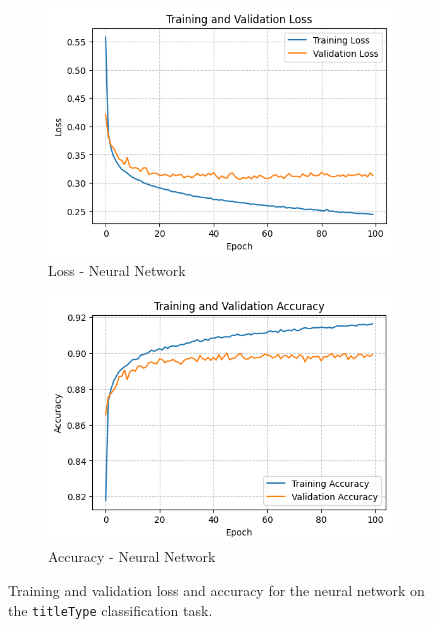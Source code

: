 
\begin{figure}
    \centering
    \begin{subfigure}[b]{0.48\textwidth}
        \centering
        \includegraphics[width=\textwidth]{plotsss/loss_titletype.png}
        \caption{Loss - Neural Network}
        \label{fig:loss_nn_titletype}
    \end{subfigure}
    \hfill
    \begin{subfigure}[b]{0.48\textwidth}
        \centering
        \includegraphics[width=\textwidth]{plotsss/accuracy_titletype.png}
        \caption{Accuracy - Neural Network}
        \label{fig:accuracy_nn_titletype}
    \end{subfigure}
    \caption{Training and validation loss and accuracy for the neural network on the \texttt{titleType} classification task.}
    \label{fig:nn_performance_titletype}
\end{figure}

